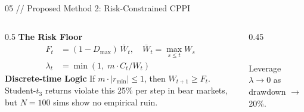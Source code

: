 \documentclass[11pt,aspectratio=169]{beamer}
\newcommand{\ca}[1]{\textcolor{bbamber}{\textbf{#1}}}
\begin{document}
\begin{frame}{05 // Proposed Method 2: Risk-Constrained CPPI}
  \begin{columns}[T]
    \begin{column}{0.5\textwidth}
      \ca{The Risk Floor}
      {\small
      \begin{align*}
        F_t &= (1-D_{\max})\,\bar{W}_t,\quad \bar{W}_t=\max_{s\leq t}W_s\\
        \lambda_t &= \min(1,\; m \cdot C_t/W_t)
      \end{align*}
      }
      \ca{Discrete-time Logic}
      {\footnotesize
      If $m\cdot|r_{\min}|\leq 1$, then $W_{t+1}\geq F_t$. Student-$t_3$ returns violate this 25\% per step in bear markets, but $N=100$ sims show no empirical ruin.
      }
    \end{column}
    \begin{column}{0.45\textwidth}
      \centering
      \\
      {\footnotesize\color{bbdim} Leverage $\lambda \to 0$ as drawdown $\to$ 20\%.}
    \end{column}
  \end{columns}
\end{frame}
\end{document}
